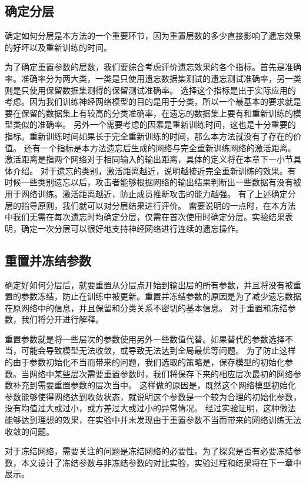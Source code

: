 \subsection{确定分层}
确定如何分层是本方法的一个重要环节，因为重置层数的多少直接影响了遗忘效果的好坏以及重新训练的时间。

为了确定重置参数的层数，我们要综合考虑评价遗忘效果的各个指标。首先是准确率。准确率分为两大类，一类是只使用遗忘数据集测试的遗忘测试准确率，另一类则是只使用保留数据集测得的保留测试准确率。
选择这个指标是出于实际应用的考虑。因为我们训练神经网络模型的目的是用于分类，所以一个最基本的要求就是要在保留的数据集上有较高的分类准确率，在遗忘的数据集上要有和重新训练的模型类似的准确率。
另外一个需要考虑的因素是重新训练时间，这也是十分重要的指标。重新训练时间如果长于完全重新训练的时间，那么本方法就没有了存在的价值。
还有一个指标是本方法遗忘后生成的网络与完全重新训练网络的激活距离。激活距离是指两个网络对于相同输入的输出距离，具体的定义将在本章下一小节具体介绍。
对于遗忘的类别，激活距离越近，说明越接近完全重新训练的效果。有时候一些类别遗忘以后，攻击者能够根据网络的输出结果判断出一些数据有没有被用于网络训练。激活距离越近，防止成员推断攻击的能力越强。
有了上述确定分层的指导原则，我们就可以对分层结果进行评价。
需要说明的一点时，在本方法中我们无需在每次遗忘时均确定分层，仅需在首次使用时确定分层。实验结果表明，确定一次分层可以很好地支持神经网络进行连续的遗忘操作。

\subsection{重置并冻结参数}
确定好如何分层后，就要重置从分层点开始到输出层的所有参数，并且将没有被重置的参数冻结，防止在训练中被更新。重置并冻结参数的原因是为了减少遗忘数据在原网络中的信息，并且保留和分类关系不密切的基本信息。
对于重置和冻结参数，我们将分开进行解释。

重置参数就是将一些层次的参数使用另外一些数值代替。如果替代的参数选择不当，可能会导致模型无法收敛，或导致无法达到全局最优等问题。
为了防止这样的由于参数初始化不当而带来的问题，我们选取的策略是，保存模型的初始化参数。当网络中某些层次需要重置参数时，我们将保存下来的相应层次最初的网络参数补充到需要重置参数的层次当中。
这样做的原因是，既然这个网络模型初始化参数能够使得网络达到收敛状态，就说明这个参数是一个较为合理的初始化参数，没有均值过大或过小，或方差过大或过小的异常情况。
经过实验证明，这种做法能够达到理想的效果，在实验中并未发现由于重置参数不当而带来的网络训练无法收敛的问题。

对于冻结网络，需要关注的问题是冻结网络的必要性。为了探究是否有必要冻结参数，本文设计了冻结参数与非冻结参数的对比实验，实验过程和结果将在下一章中展示。


